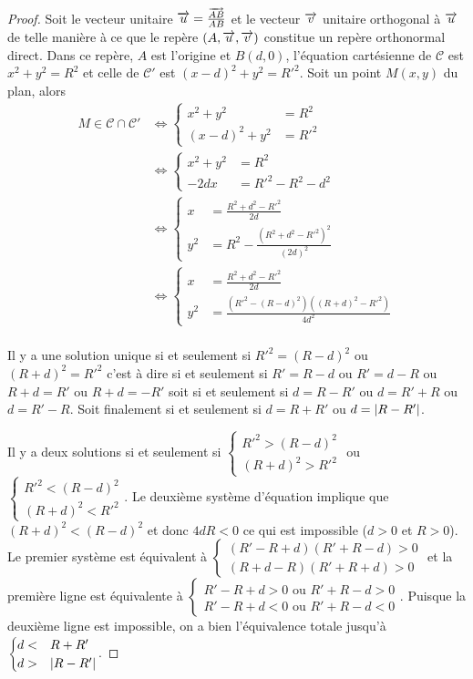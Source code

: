 \begin{proof}
  Soit le vecteur unitaire \(\overrightarrow{u}=\frac{\overrightarrow{AB}}{AB}\) et le vecteur \(\overrightarrow{v}\) unitaire orthogonal à \(\overrightarrow{u}\) de telle manière à ce que le repère \((A,\overrightarrow{u},\overrightarrow{v})\) constitue un repère orthonormal direct. Dans ce repère, \(A\) est l'origine et \(B(d,0)\), l'équation cartésienne de \(\mathcal{C}\) est \(x^2+y^2=R^2\) et celle de \(\mathcal{C}'\) est \((x-d)^2+y^2=R'^2\). Soit un point \(M(x,y)\) du plan, alors
  \begin{align}
    M \in \mathcal{C} \cap \mathcal{C}' &\iff \begin{cases} x^2+y^2&=R^2 \\ (x-d)^2+y^2 &=R'^2\end{cases}\\
&\iff \begin{cases} x^2+y^2&=R^2 \\ -2dx &=R'^2-R^2-d^2\end{cases}\\
&\iff \begin{cases} x&=\frac{R^2+d^2-R'^2}{2d} \\ y^2&=R^2-\frac{(R^2+d^2-R'^2)^2}{(2d)^2}\end{cases}\\
&\iff \begin{cases} x&=\frac{R^2+d^2-R'^2}{2d} \\ y^2&=\frac{(R'^2-(R-d)^2)((R+d)^2-R'^2)}{4d^2}\end{cases}\\
  \end{align}

Il y a une solution unique si et seulement si \(R'^2=(R-d)^2\) ou \((R+d)^2=R'^2\) c'est à dire si et seulement si \(R'=R-d\) ou \(R'=d-R\) ou \(R+d=R'\) ou \(R+d=-R'\) soit si et seulement si \(d=R-R'\) ou \(d=R'+R\) ou \(d=R'-R\). Soit finalement si et seulement si \(d=R+R'\) ou \(d=\left\lvert R-R'\right\rvert\).

Il y a deux solutions si et seulement si \(\begin{cases}R'^2 > (R-d)^2 \\ (R+d)^2>R'^2\end{cases}\) ou \(\begin{cases}R'^2 < (R-d)^2 \\ (R+d)^2<R'^2\end{cases}\).
Le deuxième système d'équation implique que \((R+d)^2<(R-d)^2\) et donc \(4dR<0\) ce qui est impossible (\(d>0\) et \(R>0\)).
Le premier système est équivalent à \(\begin{cases}(R'-R+d)(R'+R-d) > 0 \\ (R+d-R)(R'+R+d)>0\end{cases}\) et la première ligne est équivalente à \(\begin{cases} R'-R+d>0 \text{~ou~} R'+R-d> 0 \\ R'-R+d<0 \text{~ou~} R'+R-d<0\end{cases}\). Puisque la deuxième ligne est impossible, on a bien l'équivalence totale jusqu'à \(\begin{cases}d <& R+R' \\ d>&\left\lvert R-R'\right\rvert\end{cases}\).
\end{proof}

